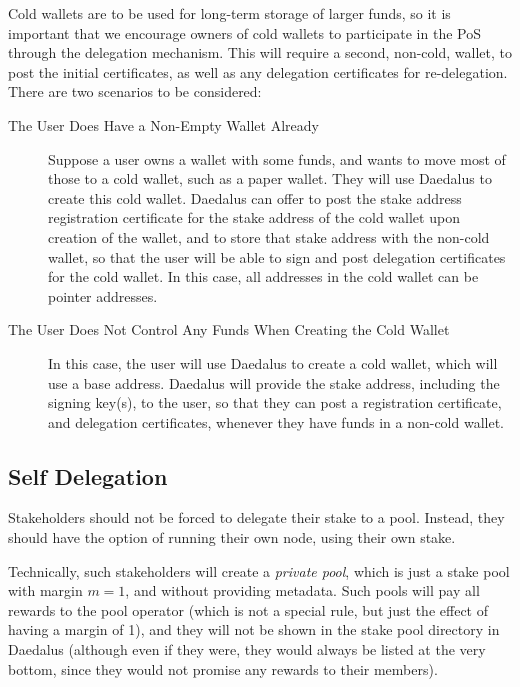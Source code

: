\documentclass[11pt,a4paper,dvipsnames,twosided]{article}
\begin{document}
Cold wallets are to be used for long-term storage of larger funds, so
it is important that we encourage owners of cold wallets to
participate in the PoS through the delegation mechanism. This will
require a second, non-cold, wallet, to post the initial certificates,
as well as any delegation certificates for re-delegation. There are
two scenarios to be considered:

\begin{description}
\item[The User Does Have a Non-Empty Wallet Already] Suppose a user
  owns a wallet with some funds, and wants to move most of those to a
  cold wallet, such as a paper wallet. They will use Daedalus to
  create this cold wallet. Daedalus can offer to post the stake address
  registration certificate for the stake address of the cold wallet upon
  creation of the wallet, and to store that stake address with the
  non-cold wallet, so that the user will be able to sign and post
  delegation certificates for the cold wallet. In this case, all
  addresses in the cold wallet can be pointer addresses.
\item[The User Does Not Control Any Funds When Creating the Cold Wallet] In this
  case, the user will use Daedalus to create a cold wallet, which will use a
  base address. Daedalus will provide the stake address, including the signing
  key(s), to the user, so that they can post a registration certificate, and
  delegation certificates, whenever they have funds in a non-cold wallet.
\end{description}

\subsection{Self Delegation}
\label{individual-staking}

Stakeholders should not be forced to delegate their stake to a
pool. Instead, they should have the option of running their own node,
using their own stake.

Technically, such stakeholders will create a \emph{private pool}, which is just
a stake pool with margin \(m=1\), and without providing metadata. Such pools
will pay all rewards to the pool operator (which is not a special rule, but just
the effect of having a margin of 1), and they will not be shown in the stake
pool directory in Daedalus (although even if they were, they would always be
listed at the very bottom, since they would not promise any rewards to their
members).
\end{document}
